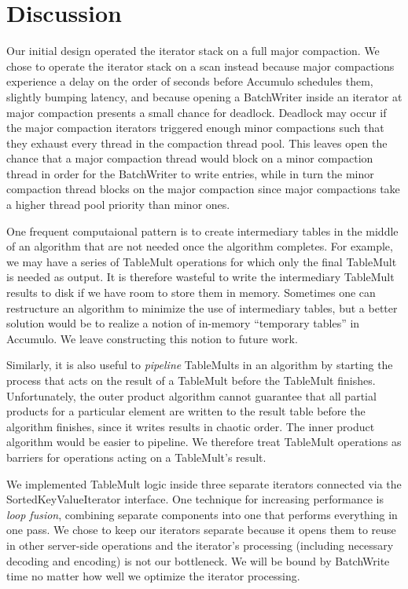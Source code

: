 
\section{Discussion}
\label{sDiscussion}

Our initial design operated the iterator stack on a full major compaction.
We chose to operate the iterator stack on a scan instead because major compactions experience
a delay on the order of seconds before Accumulo schedules them, slightly bumping latency,
and because opening a BatchWriter inside an iterator at major compaction presents a small chance for deadlock.
Deadlock may occur if the major compaction iterators triggered enough minor compactions 
such that they exhaust every thread in the compaction thread pool.
This leaves open the chance that a major compaction thread would block on a minor compaction thread
in order for the BatchWriter to write entries, while in turn the minor compaction thread blocks on 
the major compaction since major compactions take a higher thread pool priority than minor ones.

One frequent computaional pattern is to create intermediary tables in the middle of an algorithm 
that are not needed once the algorithm completes.  For example, we may have a series of TableMult operations 
for which only the final TableMult is needed as output.  It is therefore wasteful to write the intermediary
TableMult results to disk if we have room to store them in memory.
Sometimes one can restructure an algorithm to minimize the use of intermediary tables,
but a better solution would be to realize a notion of in-memory ``temporary tables'' in Accumulo.
We leave constructing this notion to future work.

Similarly, it is also useful to \emph{pipeline} TableMults in an algorithm by starting the process 
that acts on the result of a TableMult before the TableMult finishes.
Unfortunately, the outer product algorithm cannot guarantee that all partial products for a particular element 
are written to the result table before the algorithm finishes, since it writes results in chaotic order.
The inner product algorithm would be easier to pipeline.
We therefore treat TableMult operations as barriers for operations acting on a TableMult's result.


We implemented TableMult logic inside three separate iterators connected via the SortedKeyValueIterator
interface. One technique for increasing performance is \emph{loop fusion}, combining separate components into one
that performs everything in one pass.  We chose to keep our iterators separate because it opens them 
to reuse in other server-side operations and the iterator's processing (including necessary decoding and encoding)
is not our bottleneck. We will be bound by BatchWrite time no matter how well we optimize the iterator processing.


